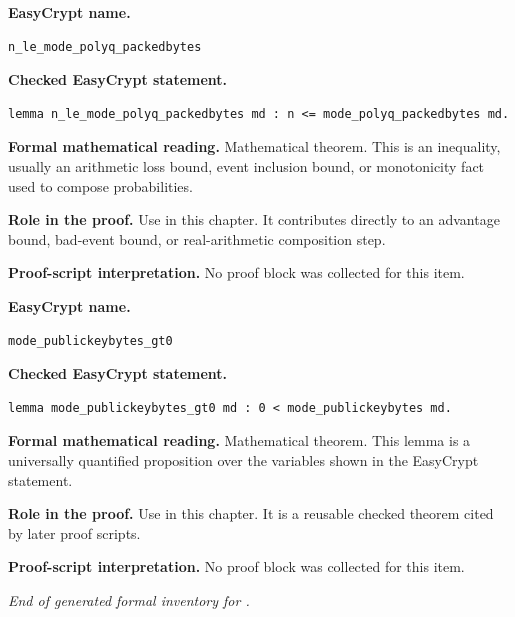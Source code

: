 \begin{formaltheorem}
\noindent\textbf{EasyCrypt name.}
\begin{lstlisting}[language=EasyCrypt,basicstyle=\ttfamily\scriptsize]
n_le_mode_polyq_packedbytes
\end{lstlisting}
\noindent\textbf{Checked EasyCrypt statement.}
\begin{lstlisting}[language=EasyCrypt,basicstyle=\ttfamily\scriptsize]
lemma n_le_mode_polyq_packedbytes md : n <= mode_polyq_packedbytes md.
\end{lstlisting}
\noindent\textbf{Formal mathematical reading.}
Mathematical theorem. This is an inequality, usually an arithmetic loss bound, event inclusion bound, or monotonicity fact used to compose probabilities.

\noindent\textbf{Role in the proof.}
Use in this chapter. It contributes directly to an advantage bound, bad-event bound, or real-arithmetic composition step.

\noindent\textbf{Proof-script interpretation.}
No proof block was collected for this item.

\end{formaltheorem}

\begin{formaltheorem}
\noindent\textbf{EasyCrypt name.}
\begin{lstlisting}[language=EasyCrypt,basicstyle=\ttfamily\scriptsize]
mode_publickeybytes_gt0
\end{lstlisting}
\noindent\textbf{Checked EasyCrypt statement.}
\begin{lstlisting}[language=EasyCrypt,basicstyle=\ttfamily\scriptsize]
lemma mode_publickeybytes_gt0 md : 0 < mode_publickeybytes md.
\end{lstlisting}
\noindent\textbf{Formal mathematical reading.}
Mathematical theorem. This lemma is a universally quantified proposition over the variables shown in the EasyCrypt statement.

\noindent\textbf{Role in the proof.}
Use in this chapter. It is a reusable checked theorem cited by later proof scripts.

\noindent\textbf{Proof-script interpretation.}
No proof block was collected for this item.

\end{formaltheorem}

\medskip
\noindent\emph{End of generated formal inventory for .}
